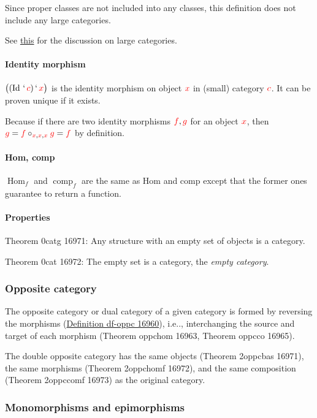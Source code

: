 \documentclass[12pt, letterpaper]{article}
\makeatletter
\newcommand{\Id}{\operatorname{Id}}
\newcommand{\Homf}{\operatorname{Hom}_f}
\newcommand{\compf}{\operatorname{comp}_f}
\newcommand\ie{i.e\@ifnextchar.{}{.\@}}
\newcommand{\red}[1]{{\color{red} #1}}
\newcommand{\blue}[1]{{\color{blue} #1}}
\newcommand{\setvar}{\red}
\newcommand{\scc}{\setvar{c}}
\newcommand{\sff}{\setvar{f}}
\newcommand{\sg}{\setvar{g}}
\newcommand{\sx}{\setvar{x}}
\newcommand{\at}{\,`\,}
\theoremstyle{definition}
\theoremstyle{remark}
\theoremstyle{definition}
\theoremstyle{plain}
\makeatother
\begin{document}
	\blue{Since proper classes are not included into any classes, this definition does not include any large categories.}
	
	See \href{https://groups.google.com/g/metamath/c/Vtz3CKGmXnI/m/Fxq3j1I_EQAJ}{this} for the discussion on large categories.
	
	\paragraph{Identity morphism}
	
	$\big((\Id\at\scc)\at\sx\big)$ is the identity morphism on object $\sx$ in (small) category $\scc$.
	It can be proven unique if it exists.
	
	Because if there are two identity morphisms $\sff,\sg$ for an object $\sx$, then $\sg=\sff\circ_{\sx,\sx,\sx}\sg=\sff$ by definition.
	
	\paragraph{Hom, comp}
	
	$\Homf$ and $\compf$ are the same as Hom and comp except that the former ones guarantee to return a function.
	
	\paragraph{Properties}
	
	Theorem	0catg 16971: Any structure with an empty set of objects is a category.
	
	Theorem	0cat 16972:	The empty set is a category, the \textit{empty category}.
	
	\subsubsection{Opposite category}
	
	The opposite category or dual category of a given category is formed by reversing the morphisms (\href{https://us.metamath.org/mpeuni/df-oppc.html}{Definition	df-oppc 16960}), \ie, interchanging the source and target of each morphism (Theorem	oppchom 16963, Theorem	oppcco 16965).
	
	The double opposite category has the same objects (Theorem	2oppcbas 16971), the same morphisms (Theorem	2oppchomf 16972), and the same composition (Theorem	2oppccomf 16973) as the original category.

	\subsubsection{Monomorphisms and epimorphisms}
	
\end{document}
